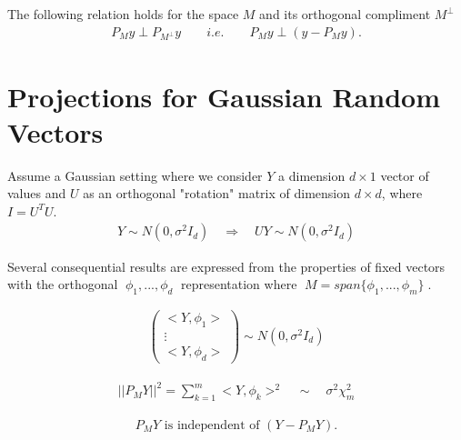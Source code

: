 \documentclass[a4paper, 11pt]{report}
\newcommand{\newchapter}[2]{
	\chapter{#1}
	\addtocontents{toc}{\vspace{.1in} \hspace{.25in} $\cdot$ #2 \par}
}
\begin{document}
The following relation holds for the space $M$ and its orthogonal compliment $M^{\perp}$ \vspace{.1in}
\begin{align*}
\boxed{P_My \perp P_{M^{\perp}}y \qquad i.e. \qquad P_My \perp (y - P_My) \bigg.}
\end{align*}






\newchapter{Projections for Gaussian Random Vectors}{2/13/14}

Assume a Gaussian setting where we consider $Y$ a dimension $d \times 1$ vector of values and $U$ as an orthogonal "rotation" matrix of dimension $d\times d$, where $I = U^{T}U$. 
\begin{align*}
	Y \sim N\left(0, \sigma^2 I_d\right)\quad \Rightarrow \quad UY \sim N\left(0, \sigma^2I_d\right)
\end{align*}


Several consequential results are expressed from the properties of fixed vectors with the orthogonal $\; \phi_1,...,\phi_d \;$ representation where  $\; M = span\{\phi_1,...,\phi_m\} \;$.

\begin{align}
	\boxed{\left(\begin{array}{c} <Y,\phi_1> \\ \vdots \\ <Y,\phi_d> \end{array}\right) \sim N(0,\sigma^2 I_d)}
\end{align}


\vspace{.1in}

\begin{align}
	\boxed{||P_MY||^2 = \sum\limits_{k=1}^m <Y,\phi_k>^2 \quad \sim \quad \sigma^2 \chi^2_m}
\end{align}


\vspace{.1in}

\begin{align}
	\boxed{P_MY \text{ is independent of } (Y-P_MY) \bigg.} 
\end{align}








\end{document}
